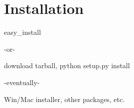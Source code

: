 \chapter{Installation \label{installation}}

easy_install

-or-

download tarball, python setup.py install

-eventually-

Win/Mac installer, other packages, etc.